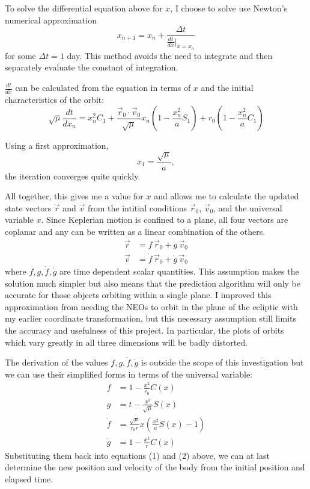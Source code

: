 \documentclass[12pt]{article}
\begin{document}
To solve the differential equation above for $x$, I choose to solve use Newton's numerical approximation
$$x_{n+1} = x_n + \frac{\Delta t}{\frac{dt}{dx}\vert_{x=x_n}}$$
for some $\Delta t = 1$ day. This method avoids the need to integrate and then separately evaluate the constant of integration. 

$\frac{dt}{dx}$ can be calculated from the equation in terms of $x$ and the initial characteristics of the orbit:
$$\sqrt{\mu} \frac{dt}{dx_n} = x_n^2 C_1 + \frac{\vec{r}_0 \cdot \vec{v}_0}{\sqrt{\mu}} x_n (1 - \frac{x_n^2}{a} S_1) + r_0 (1 - \frac{x_n^2}{a} C_1)$$

Using a first approximation,
$$x_1 = \frac{\sqrt{\mu}}{a},$$
the iteration converges quite quickly. 

All together, this gives me a value for $x$ and allows me to calculate the updated state vectors $\vec{r}$ and $\vec{v}$ from the intitial conditions $\vec{r}_0$, $\vec{v}_0$, and the universal variable $x$. Since Keplerian motion is confined to a plane, all four vectors are coplanar and any can be written as a linear combination of the others. 
\begin{align}
    \vec{r} &= f\, \vec{r}_0 + g\, \vec{v}_0\\
    \vec{v} &= \dot{f}\, \vec{r}_0 + \dot{g}\, \vec{v}_0
\end{align}
where $f, g, \dot{f}, \dot{g}$ are time dependent scalar quantities. This assumption makes the solution much simpler but also means that the prediction algorithm will only be accurate for those objects orbiting within a single plane. I improved this approximation from needing the NEOs to orbit in the plane of the ecliptic with my earlier coordinate transformation, but this necessary assumption still limits the accuracy and usefulness of this project. In particular, the plots of orbits which vary greatly in all three dimensions will be badly distorted.
 
The derivation of the values $f, g, \dot{f}, \dot{g}$ is outside the scope of this investigation but we can use their simplified forms in terms of the universal variable:
\begin{align*}
    f &= 1 - \frac{x^2}{r_0} C(x)\\
    g &= t - \frac{x^3}{\sqrt{\mu}} S(x)\\
    \dot{f} &= \frac{\sqrt{\mu}}{r_0 r} x (\frac{x^2}{a}S(x) - 1)\\
    \dot{g} &= 1 - \frac{x^2}{r} C(x)
\end{align*}
Substituting them back into equations (1) and (2) above, we can at last determine the new position and velocity of the body from the initial position and elapsed time. 
\end{document}
